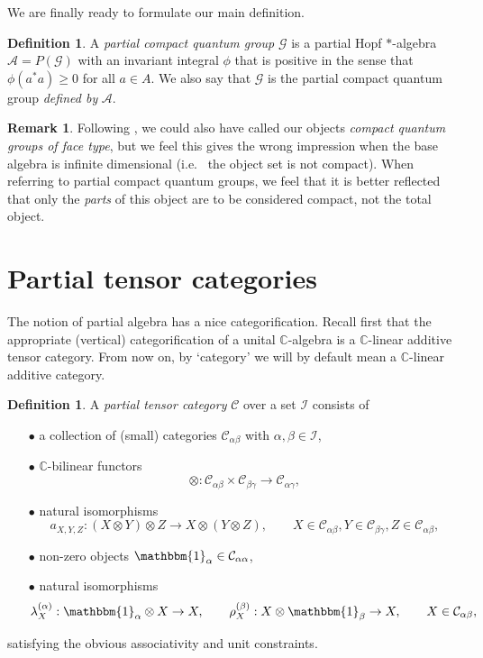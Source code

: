 \documentclass[11pt]{article}
\newcommand{\C}{\mathbb{C}}
\newcommand{\CatC}{\mathcal{C}}
\newcommand{\CatCC}{\mathscr{C}}
\newcommand{\Unitb}{\mathbbm{1}}
\theoremstyle{definition}
\newtheorem{Def}[Theorem]{Definition}
\newtheorem{Rem}[Theorem]{Remark}
\numberwithin{equation}{section}
\begin{document}
We are finally ready to formulate our main definition.
\begin{Def} A \emph{partial compact quantum group} $\mathscr{G}$ is a
  partial Hopf $*$-algebra $\mathscr{A} = P(\mathscr{G})$ with an invariant integral  $\phi$ that is positive in the sense  that $\phi(a^*a)\geq 0$ for all $a\in A$. We also say that $\mathscr{G}$ is the partial compact quantum group \emph{defined by} $\mathscr{A}$.
\end{Def} 

\begin{Rem} Following \cite{Hay1}, we could also have called our objects \emph{compact quantum groups of face type}, but we feel this gives the wrong impression when the base algebra is infinite dimensional (i.e.~ the object set is not compact). When referring to partial compact quantum groups, we feel that it is better reflected that only the \emph{parts} of this object are to be considered compact, not the total object. 
\end{Rem} 

\section{Partial tensor categories}


The notion of partial algebra has a nice categorification. Recall first that the appropriate (vertical) categorification of a unital $\C$-algebra is a $\C$-linear additive tensor category. From now on, by `category' we will by default mean a $\C$-linear additive category. 

\begin{Def} A \emph{partial tensor category} $\CatCC$ over a set $\mathscr{I}$ consists of 
\begin{itemize}
\item[$\bullet$] a collection of (small) categories $\mathcal{C}_{\alpha\beta}$ with $\alpha,\beta\in \mathscr{I}$, 
\item[$\bullet$] $\C$-bilinear functors \[\otimes: \CatC_{\alpha\beta}\times \CatC_{\beta\gamma}\rightarrow \CatC_{\alpha\gamma},\] 
\item[$\bullet$] natural isomorphisms \[ a_{X,Y,Z}: (X\otimes Y)\otimes Z \rightarrow X\otimes (Y\otimes Z),\qquad X \in \CatC_{\alpha\beta},Y\in \CatC_{\beta\gamma},Z\in \CatC_{\alpha\beta},\] 
\item[$\bullet$] non-zero objects $\Unitb_{\alpha} \in \CatC_{\alpha\alpha}$,
\item[$\bullet$] natural isomorphisms \[\lambda_X^{(\alpha)}:\Unitb_\alpha\otimes X \rightarrow X,\qquad \rho_X^{(\beta)}:X\otimes \Unitb_\beta\rightarrow X, \qquad X\in \CatC_{\alpha\beta},\]
\end{itemize}
satisfying the obvious associativity and unit constraints. 
\end{Def}
\end{document}
